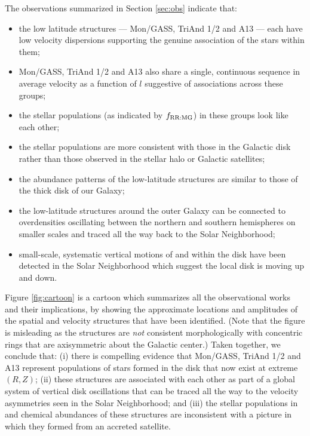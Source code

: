 \documentclass[galaxies,article,submit,moreauthors,pdftex,10pt,a4paper]{mdpi}
\newcommand{\frrmg}{\ensuremath{f_{\rm RR:MG}}}
\begin{document}
The observations summarized in Section \ref{sec:obs} indicate that:
\begin{itemize}
\item the low latitude structures --- Mon/GASS, TriAnd 1/2 and A13  --- each have low velocity dispersions supporting the genuine association of the stars within them;
\item Mon/GASS, TriAnd 1/2 and A13 also share a single, continuous sequence in average velocity as a function of $l$ suggestive of associations across these groups;
\item the stellar populations (as indicated by \frrmg) in these groups look like each other;
\item the stellar populations are more consistent with those in the Galactic disk rather than those observed in the stellar halo or Galactic  satellites;
\item the abundance patterns  of the low-latitude structures are similar to those of the thick disk of our Galaxy;
\item the low-latitude structures around the outer Galaxy can be connected to overdensities oscillating between the northern and southern hemispheres on smaller scales and traced all the way back to the Solar Neighborhood;
\item small-scale, systematic vertical motions of and within the disk have been detected in the Solar Neighborhood which suggest the local disk is moving up and down.
\end{itemize}


Figure \ref{fig:cartoon} is a cartoon which summarizes all the observational works and their implications, by showing the approximate locations and amplitudes of the spatial and velocity structures that have been identified. (Note that the figure is misleading as the structures are {\it not} consistent morphologically with concentric rings that are axisymmetric about the Galactic center.)
Taken together, we conclude that: (i) there is compelling evidence that Mon/GASS, TriAnd 1/2 and A13 represent populations of stars formed in the disk that now exist at extreme $(R,Z)$;
(ii) these structures are associated with each other as part of a global system of vertical disk oscillations that can be traced all the way to the velocity asymmetries seen in the Solar Neighborhood; and
(iii) the stellar populations in and chemical abundances of these structures are inconsistent with a picture in which they formed from an accreted satellite.
\end{document}
